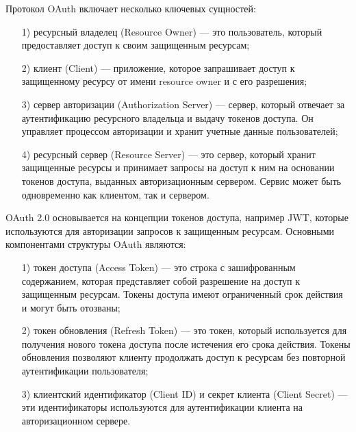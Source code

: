 Протокол OAuth включает несколько ключевых сущностей:
 \begin{enumerate}
  \item[1)] ресурсный владелец (Resource Owner) --- это пользователь, который предоставляет доступ к своим защищенным ресурсам;
  \item[2)] клиент (Client) --- приложение, которое запрашивает доступ к защищенному ресурсу от имени resource owner и с его разрешения;
  \item[3)] сервер авторизации (Authorization Server) --- сервер, который отвечает за аутентификацию ресурсного владельца и выдачу токенов доступа. Он управляет процессом авторизации и хранит учетные данные пользователей;
  \item[4)] ресурсный сервер (Resource Server) --- это сервер, который хранит защищенные ресурсы и принимает запросы на доступ к ним на основании токенов доступа, выданных авторизационным сервером. Сервис может быть одновременно как клиентом, так и сервером.
\end{enumerate}

OAuth 2.0 основывается на концепции токенов доступа, например JWT, которые используются для авторизации запросов к защищенным ресурсам.
Основными компонентами структуры OAuth являются:
 \begin{enumerate}
  \item[1)] токен доступа (Access Token) --- это строка с зашифрованным содержанием, которая представляет собой разрешение на доступ к защищенным ресурсам. Токены доступа имеют ограниченный срок действия и могут быть отозваны;
  \item[2)] токен обновления (Refresh Token) --- это токен, который используется для получения нового токена доступа после истечения его срока действия. Токены обновления позволяют клиенту продолжать доступ к ресурсам без повторной аутентификации пользователя;
  \item[3)] клиентский идентификатор (Client ID) и секрет клиента (Client Secret) --- эти идентификаторы используются для аутентификации клиента на авторизационном сервере.
\end{enumerate}

